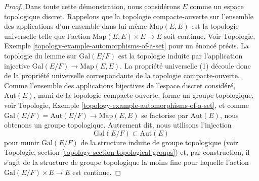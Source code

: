 \begin{proof}
Dans toute cette démonstration, nous considérons $E$ comme un espace topologique discret.
Rappelons que la topologie compacte-ouverte sur l'ensemble des applications d'un ensemble dans lui-même
$\text{Map}(E, E)$ est la topologie universelle telle que l'action
$\text{Map}(E, E) \times E \to E$ soit continue. Voir
Topologie, Exemple \ref{topology-example-automorphisms-of-a-set}
pour un énoncé précis. La topologie du lemme sur
$\text{Gal}(E/F)$ est la topologie induite par l'application injective
$\text{Gal}(E/F) \to \text{Map}(E, E)$.
La propriété universelle (1) découle donc de la propriété universelle
correspondante de la topologie compacte-ouverte.
Comme l'ensemble des applications bijectives de l'espace discret considéré, $\text{Aut}(E)$,
muni de la topologie compacte-ouverte, forme un groupe topologique, voir
Topologie, Exemple \ref{topology-example-automorphisms-of-a-set},
et comme $\text{Gal}(E/F) = \text{Aut}(E/F) \to \text{Map}(E, E)$
se factorise par $\text{Aut}(E)$, nous obtenons un groupe topologique.
Autrement dit, nous utilisons l'injection
$$
\text{Gal}(E/F) \subset \text{Aut}(E)
$$
pour munir $\text{Gal}(E/F)$ de la structure induite de groupe topologique
(voir Topologie, section \ref{topology-section-topological-groups})
et, par construction, il s'agit de la structure de groupe topologique
la moins fine pour laquelle l'action $\text{Gal}(E/F) \times E \to E$ est continue.


\end{proof}
